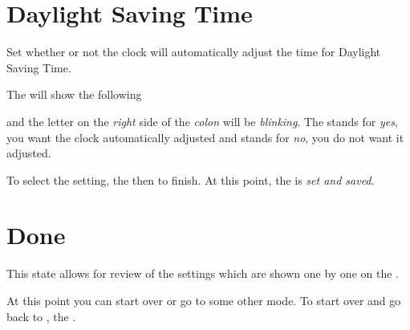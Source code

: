 \section{Daylight Saving Time} 

Set whether or not the clock will automatically adjust the time for Daylight
Saving Time.

\par\medskip

The  will show the following


and the letter on the \textit{right} side of the \textit{colon} will be
\textit{blinking}.  The  stands for \textit{yes}, you want
the clock automatically adjusted and  stands for \textit{no},
you do not want it adjusted.

\par\medskip

To select the  setting,  the  then  to finish.
At this point, the  is \textit{set and saved}.


\pagebreak
\section{Done} 

This state allows for review of the settings which are shown one by one on the
.

\par\medskip

At this point you can start over or go to some other mode.  To start over and go
back to ,  the .



